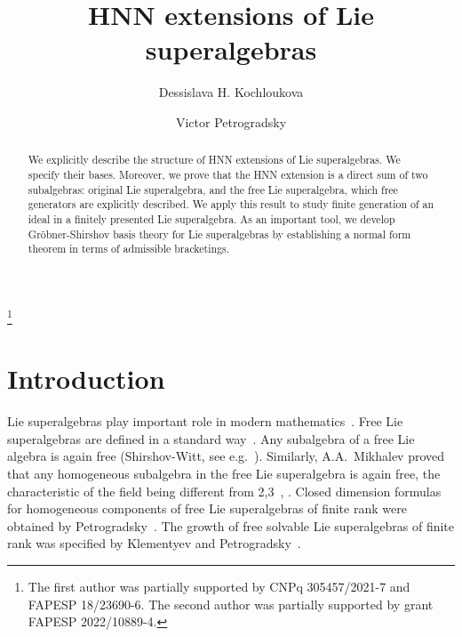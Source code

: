 \documentclass[12pt, reqno]{amsart}
\theoremstyle{remark}
\theoremstyle{definition}
\numberwithin{equation}{section}
\begin{document}
\title[Lie superalgebras]
{HNN extensions of Lie superalgebras}

\author{Dessislava H. Kochloukova}

\address
{Department of Mathematics, State University of Campinas (UNICAMP), 13083-859, Campinas, SP, Brazil}


\author{Victor Petrogradsky}

\address{Department of Mathematics, University of Brasilia, 70910-900 Brasilia DF, Brazil}
\thanks{The first author was partially supported by
 CNPq 305457/2021-7 and  FAPESP
18/23690-6.
The second author was partially supported by grant FAPESP 2022/10889-4.}



\begin{abstract}
We explicitly describe the structure of HNN extensions of Lie superalgebras. 
We specify their bases. 
Moreover, we prove that the HNN extension is a direct sum of two subalgebras: original Lie superalgebra,  and
the free Lie superalgebra, which free generators are explicitly described. 
We apply this result to study finite generation of an ideal in a finitely presented Lie superalgebra.
As an important tool,  we develop Gr\"obner-Shirshov basis theory for Lie superalgebras by establishing a normal form theorem in terms of admissible bracketings.  

\end{abstract}
\maketitle
\section*{Introduction}

Lie superalgebras play important role in modern mathematics~\cite{Kac77,Scheunert}.
Free Lie superalgebras are defined in a standard way~\cite{BMPZ}.
Any subalgebra of a free Lie algebra is again free (Shirshov-Witt, see e.g.~\cite{Ba}).
Similarly, A.A.~Mikhalev proved that any homogeneous subalgebra in the free Lie superalgebra is again free,
the characteristic of the field being different from 2,3~\cite[Theorem 3.3]{M}, \cite[Theorem 3.15]{BMPZ}.
Closed dimension formulas for homogeneous components of free Lie superalgebras of finite rank were obtained by Petrogradsky~\cite{Pe00}.
The growth of free solvable Lie superalgebras of finite rank was specified by Klementyev and Petrogradsky~\cite{KlPe05}.
\end{document}
